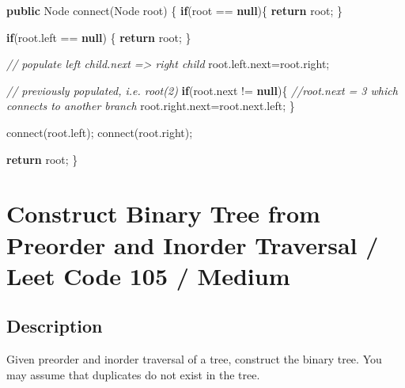 \documentclass[]{book}
\newenvironment{Shaded}{\begin{snugshade}}{\end{snugshade}}
\newcommand{\BuiltInTok}[1]{#1}
\newcommand{\CommentTok}[1]{\textcolor[rgb]{0.56,0.35,0.01}{\textit{#1}}}
\newcommand{\FunctionTok}[1]{\textcolor[rgb]{0.00,0.00,0.00}{#1}}
\newcommand{\KeywordTok}[1]{\textcolor[rgb]{0.13,0.29,0.53}{\textbf{#1}}}
\newcommand{\NormalTok}[1]{#1}
\begin{document}
\begin{Shaded}
\begin{Highlighting}[]
\KeywordTok{public} \BuiltInTok{Node} \FunctionTok{connect}\NormalTok{(}\BuiltInTok{Node}\NormalTok{ root) \{}
    \KeywordTok{if}\NormalTok{(root == }\KeywordTok{null}\NormalTok{)\{}
        \KeywordTok{return}\NormalTok{ root;}
\NormalTok{    \}}

    \KeywordTok{if}\NormalTok{(root.}\FunctionTok{left}\NormalTok{ == }\KeywordTok{null}\NormalTok{) \{}
        \KeywordTok{return}\NormalTok{ root;}
\NormalTok{    \}}

    \CommentTok{// populate left child.next => right child}
\NormalTok{    root.}\FunctionTok{left}\NormalTok{.}\FunctionTok{next}\NormalTok{=root.}\FunctionTok{right}\NormalTok{;}

    \CommentTok{// previously populated, i.e. root(2)}
    \KeywordTok{if}\NormalTok{(root.}\FunctionTok{next}\NormalTok{ != }\KeywordTok{null}\NormalTok{)\{}
        \CommentTok{//root.next = 3 which connects to another branch}
\NormalTok{        root.}\FunctionTok{right}\NormalTok{.}\FunctionTok{next}\NormalTok{=root.}\FunctionTok{next}\NormalTok{.}\FunctionTok{left}\NormalTok{;}
\NormalTok{    \}}

    \FunctionTok{connect}\NormalTok{(root.}\FunctionTok{left}\NormalTok{);}
    \FunctionTok{connect}\NormalTok{(root.}\FunctionTok{right}\NormalTok{);}

    \KeywordTok{return}\NormalTok{ root;}
\NormalTok{\}}
\end{Highlighting}
\end{Shaded}

\hypertarget{construct-binary-tree-from-preorder-and-inorder-traversal-leet-code-105-medium}{%
\section{Construct Binary Tree from Preorder and Inorder Traversal / Leet Code 105 / Medium}\label{construct-binary-tree-from-preorder-and-inorder-traversal-leet-code-105-medium}}

\hypertarget{description-79}{%
\subsection{Description}\label{description-79}}

Given preorder and inorder traversal of a tree, construct the binary tree. You may assume that duplicates do not
exist in the tree.
\end{document}
